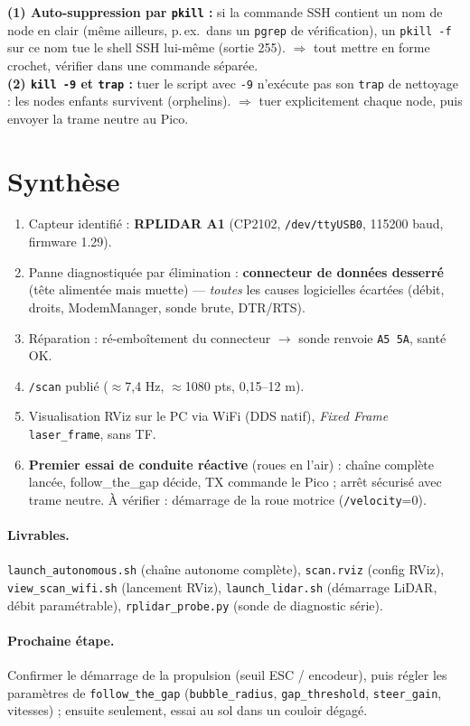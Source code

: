 \documentclass[a4paper,11pt]{article}
\begin{document}
\begin{tcolorbox}[colback=lightorange,colframe=warning,title=Deux pièges rencontrés à l'arrêt]
\textbf{(1) Auto-suppression par \texttt{pkill} :} si la commande SSH contient un
nom de node en clair (même ailleurs, p.\,ex.\ dans un \texttt{pgrep} de
vérification), un \texttt{pkill -f} sur ce nom tue le shell SSH lui-même
(sortie 255). $\Rightarrow$ tout mettre en forme crochet, vérifier dans une
commande séparée.\\
\textbf{(2) \texttt{kill -9} et \texttt{trap} :} tuer le script avec \texttt{-9}
n'exécute pas son \texttt{trap} de nettoyage : les nodes enfants survivent
(orphelins). $\Rightarrow$ tuer explicitement chaque node, puis envoyer la trame
neutre au Pico.
\end{tcolorbox}

\section{Synthèse}
\begin{enumerate}[leftmargin=1.6em]
  \item Capteur identifié : \textbf{RPLIDAR A1} (CP2102, \texttt{/dev/ttyUSB0},
        115200 baud, firmware 1.29).
  \item Panne diagnostiquée par élimination : \textbf{connecteur de données
        desserré} (tête alimentée mais muette) — \emph{toutes} les causes
        logicielles écartées (débit, droits, ModemManager, sonde brute, DTR/RTS).
  \item Réparation : ré-emboîtement du connecteur $\rightarrow$ sonde renvoie
        \texttt{A5 5A}, santé OK.
  \item \texttt{/scan} publié ($\approx$7,4 Hz, $\approx$1080 pts, 0,15--12 m).
  \item Visualisation RViz sur le PC via WiFi (DDS natif), \emph{Fixed Frame}
        \texttt{laser\_frame}, sans TF.
  \item \textbf{Premier essai de conduite réactive} (roues en l'air) : chaîne
        complète lancée, follow\_the\_gap décide, TX commande le Pico ; arrêt
        sécurisé avec trame neutre. À vérifier : démarrage de la roue motrice
        (\texttt{/velocity}=0).
\end{enumerate}

\paragraph{Livrables.}
\texttt{launch\_autonomous.sh} (chaîne autonome complète),
\texttt{scan.rviz} (config RViz), \texttt{view\_scan\_wifi.sh} (lancement RViz),
\texttt{launch\_lidar.sh} (démarrage LiDAR, débit paramétrable),
\texttt{rplidar\_probe.py} (sonde de diagnostic série).

\paragraph{Prochaine étape.}
Confirmer le démarrage de la propulsion (seuil ESC / encodeur), puis régler les
paramètres de \texttt{follow\_the\_gap} (\texttt{bubble\_radius},
\texttt{gap\_threshold}, \texttt{steer\_gain}, vitesses) ; ensuite seulement,
essai au sol dans un couloir dégagé.
\end{document}
